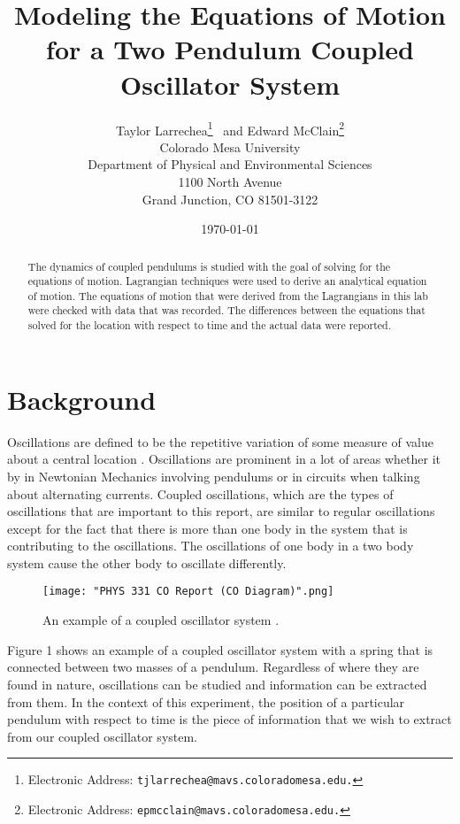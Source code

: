 \documentclass[twocolumn]{article}
\title{\textbf{Modeling the Equations of Motion for a Two Pendulum Coupled Oscillator System}}
\author{Taylor Larrechea\footnote{Electronic Address: \texttt{tjlarrechea@mavs.coloradomesa.edu.}} \ and Edward McClain\footnote{Electronic Address: \texttt{epmcclain@mavs.coloradomesa.edu.}} \\
    Colorado Mesa University \\
    Department of Physical and Environmental Sciences \\
    1100 North Avenue \\
    Grand Junction, CO 81501-3122}
\date{\today}
\begin{document}
\maketitle
\begin{abstract}
The dynamics of coupled pendulums is studied with the goal of solving for the equations of motion. Lagrangian techniques were used to derive an analytical equation of motion. The equations of motion that were derived from the Lagrangians in this lab were checked with data that was recorded. The differences between the equations that solved for the location with respect to time and the actual data were reported.
\end{abstract}
\section*{Background}
Oscillations are defined to be the repetitive variation of some measure of value about a central location \cite{WikiOsc}. Oscillations are prominent in a lot of areas whether it by in Newtonian Mechanics involving pendulums or in circuits when talking about alternating currents. Coupled oscillations, which are the types of oscillations that are important to this report, are similar to regular oscillations except for the fact that there is more than one body in the system that is contributing to the oscillations. The oscillations of one body in a two body system cause the other body to oscillate differently.
\begin{figure}[htbp]
\begin{center}
\texttt{[image: "PHYS 331 CO Report (CO Diagram)".png]}
\caption{An example of a coupled oscillator system \cite{WikiCoup}.}
\end{center}
\end{figure}
\newline
Figure 1 shows an example of a coupled oscillator system with a spring that is connected between two masses of a pendulum. Regardless of where they are found in nature, oscillations can be studied and information can be extracted from them. In the context of this experiment, the position of a particular pendulum with respect to time is the piece of information that we wish to extract from our coupled oscillator system.
\end{document}
